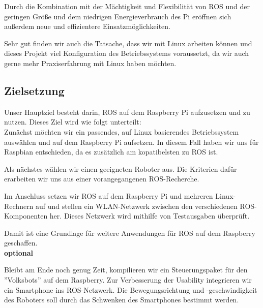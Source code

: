 \documentclass[12pt]{article}
\begin{document}
Durch die Kombination mit der Mächtigkeit und Flexibilität von ROS und der geringen Größe und dem niedrigen Energieverbrauch des Pi eröffnen sich außerdem neue und effizientere Einsatzmöglichkeiten.

Sehr gut finden wir auch die Tatsache, dass wir mit Linux arbeiten können und dieses Projekt viel Konfiguration des Betriebssystems voraussetzt, da wir auch gerne mehr Praxiserfahrung mit Linux haben möchten.








\subsection{Zielsetzung}


Unser Hauptziel besteht darin, ROS auf dem Raspberry Pi aufzusetzen und zu nutzen. Dieses Ziel wird wie folgt unterteilt:\\

Zunächst möchten wir ein passendes, auf Linux basierendes Betriebssystem auswählen und auf dem Raspberry Pi aufsetzen. In diesem Fall haben wir uns für Raspbian entschieden, da es zusätzlich am kopatibelsten zu ROS ist.

Als nächstes wählen wir einen geeigneten Roboter aus. Die Kriterien dafür erarbeiten wir uns aus einer vorangegangenen ROS-Recherche.

Im Anschluss setzen wir ROS auf dem Raspberry Pi und mehreren Linux-Rechnern auf und stellen ein WLAN-Netzwerk zwischen den verschiedenen ROS-Komponenten her.
Dieses Netzwerk wird mithilfe von Testausgaben überprüft.

Damit ist eine Grundlage für weitere Anwendungen für ROS auf dem Raspberry geschaffen.\\

{\bf optional}

Bleibt am Ende noch genug Zeit, kompilieren wir ein Steuerungspaket für den ''Volksbots'' auf dem Raspberry. Zur Verbesserung der Usability integrieren wir ein Smartphone ins ROS-Netzwerk. Die Bewegungsrichtung und -geschwindigkeit des Roboters soll durch das Schwenken des Smartphones bestimmt werden.
\end{document}
